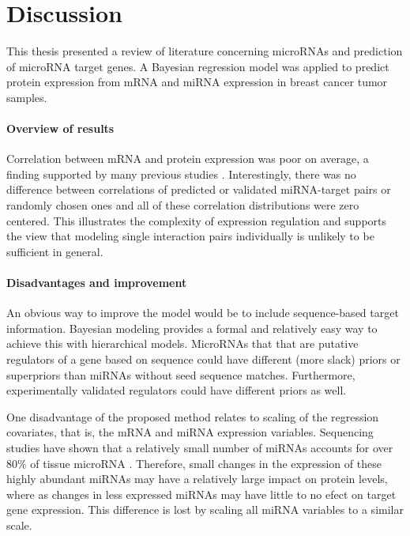 

\section{Discussion}

This thesis presented a review of literature concerning microRNAs and
prediction of microRNA target genes. A Bayesian regression model was applied
to predict protein expression from mRNA and miRNA expression in breast cancer
tumor samples.

\paragraph{Overview of results}

Correlation between mRNA and protein expression was poor on average, a finding
supported by many previous studies \citep{Payne2015}. Interestingly,
there was no difference between correlations of predicted or validated
miRNA-target pairs or randomly chosen ones and all of these correlation
distributions were zero centered. This illustrates the
complexity of expression regulation and supports the view that modeling
single interaction pairs individually is unlikely to be sufficient in
general.

\paragraph{Disadvantages and improvement}

An obvious way to improve the model would be to include sequence-based target
information. Bayesian modeling provides a formal and relatively easy way to
achieve this with hierarchical models. MicroRNAs that that are putative
regulators of a gene based on sequence could have different (more slack)
priors or superpriors than miRNAs without seed sequence matches. Furthermore,
experimentally validated regulators could have different priors as well.

One disadvantage of the proposed method relates to scaling of the regression
covariates, that is, the mRNA and miRNA expression variables. Sequencing studies have shown
that a relatively small number of miRNAs accounts for over 80\% of tissue microRNA
\citep{Landgraf2007}. Therefore, small changes in the expression of these highly
abundant miRNAs may have a relatively large impact on protein levels, where as
changes in less expressed miRNAs may have little to no efect on target gene
expression. This difference is lost by scaling all miRNA variables to a similar scale.

